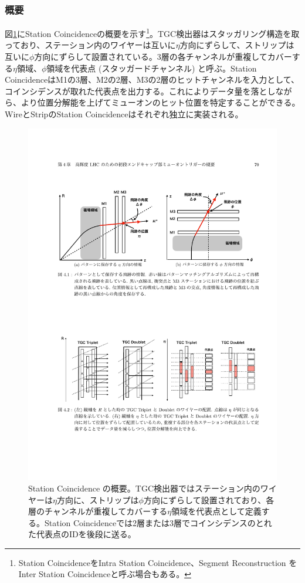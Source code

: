 \subsubsection*{概要}
図\ref{Concept_station}にStation Coincidenceの概要を示す\footnote{Station CoincidenceをIntra Station Coincidence、Segment Reconstruction を Inter Station Coincidenceと呼ぶ場合もある。}。TGC検出器はスタッガリング構造を取っており、ステーション内のワイヤーは互いに$\eta$方向にずらして、ストリップは互いに$\phi$方向にずらして設置されている。3層の各チャンネルが重複してカバーする$\eta$領域、$\phi$領域を代表点 (スタッガードチャンネル) と呼ぶ。Station CoincidenceはM1の3層、M2の2層、M3の2層のヒットチャンネルを入力として、コインシデンスが取れた代表点を出力する。これによりデータ量を落としながら、より位置分解能を上げてミューオンのヒット位置を特定することができる。WireとStripのStation Coincidenceはそれぞれ独立に実装される。

\begin{figure} 
\centering
\includegraphics[width=16cm]{fig/SL/Concept_station.pdf}
\caption[Station コインシデンスの概要]{Station Coincidence の概要\cite{mt_mino}。TGC検出器ではステーション内のワイヤーは$\eta$方向に、ストリップは$\phi$方向にずらして設置されており、各層のチャンネルが重複してカバーする$\eta$領域を代表点として定義する。Station Coincidenceでは2層または3層でコインシデンスのとれた代表点のIDを後段に送る。}
\label{Concept_station}
\end{figure}

